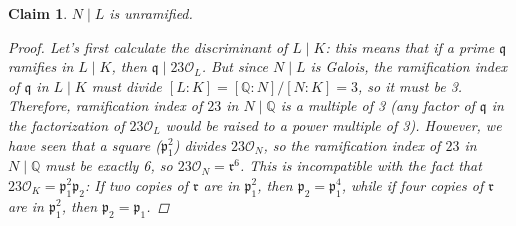 \documentclass[11pt]{article}
\newtheorem{claim}[theorem]{Claim}
\theoremstyle{definition}
\begin{document}
    \begin{claim}
        $N \mid L$ is unramified.
        \begin{proof}

            Let's first calculate the discriminant of $L\mid K$:
            this means that if a prime $\mathfrak{q}$ ramifies in $L\mid K$,
            then $\mathfrak{q} \mid 23 \mathcal{O}_L$.
            But since $N \mid L$ is Galois, the ramification index of
            $\mathfrak{q}$ in $L\mid K$ must divide $[L:K] = [\mathbb{Q} : N] / [N : K] = 3$, so it must be 3.
            Therefore, ramification index of $23$ in $N\mid \mathbb{Q}$ is a multiple of 3
            (any factor of $\mathfrak{q}$ in the factorization of $23 \mathcal{O}_L$ would be raised to a power multiple of 3).
            However, we have seen that a square ($\mathfrak{p}_1^2$) divides $23 \mathcal{O}_N$,
            so the ramification index of $23$ in $N\mid \mathbb{Q}$ must be exactly 6, so $23\mathcal{O}_N = \mathfrak{r}^6$.
            This is incompatible with the fact that $23 \mathcal{O}_K = \mathfrak{p}_1^2 \mathfrak{p}_2$:
            If two copies of $\mathfrak{r}$ are in $\mathfrak{p}_1^2$, then $\mathfrak{p_2}=\mathfrak{p}_1^4$,
            while if four copies of $\mathfrak{r}$ are in $\mathfrak{p}_1^2$, then $\mathfrak{p_2}=\mathfrak{p}_1$.

        \end{proof}
    \end{claim}
\end{document}

